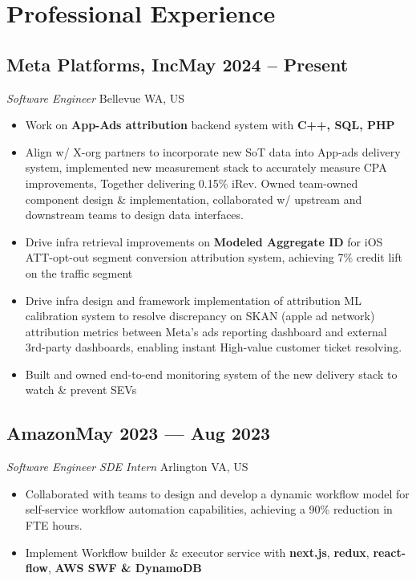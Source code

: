 \documentclass[a4,12pt]{article}
\newcommand{\subtext}[1]{
#1\par\vspace{-0.3cm}}
\newenvironment{zitemize}{
\begin{itemize}\itemsep0pt \parskip0pt \parsep1pt}
{\end{itemize}\vspace{-0.5cm}}
\begin{document}
\section{\textbf{Professional Experience}}

\vspace{-0.15cm}
\subsection*{\normalsize\textbf{Meta Platforms, Inc}\hfill May 2024 -- Present}
\subtext{\textit{Software Engineer} \hfill Bellevue WA, US}
    \begin{zitemize}
        \item Work on \textbf{App-Ads attribution} backend system with \textbf{C++, SQL, PHP}
        \item Align w/ X-org partners to incorporate new SoT data into App-ads delivery system, implemented new measurement stack to accurately measure CPA improvements, Together delivering 0.15\% iRev. Owned team-owned component design \& implementation, collaborated w/ 
        upstream and downstream teams to design data interfaces.
        \item Drive infra retrieval improvements on \textbf{Modeled Aggregate ID} for iOS ATT-opt-out segment conversion attribution system, achieving 7\% credit lift on the traffic segment
        \item Drive infra design and framework implementation of attribution ML calibration system to resolve discrepancy on SKAN (apple ad network) attribution metrics between Meta's ads reporting dashboard and external 3rd-party dashboards, enabling instant High-value customer ticket resolving.
        \item Built and owned end-to-end monitoring system of the new delivery stack to watch \& prevent SEVs
    \end{zitemize}
        
\vspace{-0.15cm}

\subsection*{\normalsize\textbf{Amazon}\hfill May 2023 --- Aug 2023 } 
\subtext{\textit{Software Engineer SDE Intern} \hfill Arlington VA, US} 
    \begin{zitemize}
        \item Collaborated with teams to design and develop a dynamic workflow model for self-service workflow automation capabilities, achieving a 90\% reduction in FTE hours.
        \item Implement Workflow builder \& executor service with \textbf{next.js}, \textbf{redux}, \textbf{react-flow}, \textbf{AWS SWF \& DynamoDB}
    \end{zitemize}
\end{document}
